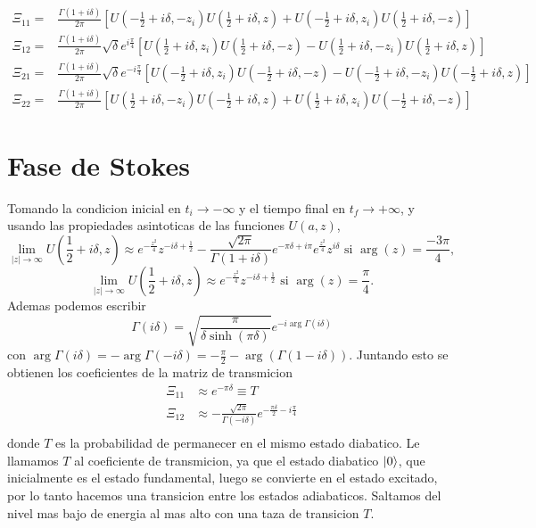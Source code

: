 \begin{align}
    \Xi_11=&\frac{\Gamma(1+i\delta)}{2\pi} \left[ U(-\frac{1}{2}+i\delta, -z_i)U(\frac{1}{2}+i\delta, z) + U(-\frac{1}{2}+i\delta, z_i)U(\frac{1}{2}+i\delta, -z) \right] \\
    \Xi_{12}=&\frac{\Gamma(1+i\delta)}{2\pi} \sqrt{\delta} e^{i\frac{\pi}{4}} \left[ U(\frac{1}{2}+i\delta, z_i)U(\frac{1}{2}+i\delta, -z) - U(\frac{1}{2}+i\delta, -z_i)U(\frac{1}{2}+i\delta, z) \right] \\
    \Xi_{21}=&\frac{\Gamma(1+i\delta)}{2\pi} \sqrt{\delta} e^{-i\frac{\pi}{4}} \left[ U(-\frac{1}{2}+i\delta, z_i) U(-\frac{1}{2}+i\delta, -z)- U(-\frac{1}{2}+i\delta, -z_i)U(-\frac{1}{2}+i\delta, z) \right] \\
    \Xi_{22}=&\frac{\Gamma(1+i\delta)}{2\pi} \left[ U(\frac{1}{2}+i\delta, -z_i)U(-\frac{1}{2}+i\delta, z) + U(\frac{1}{2}+i\delta, z_i)U(-\frac{1}{2}+i\delta, -z) \right]
\end{align}
\section{Fase de Stokes}
Tomando la condicion inicial en $t_i \to -\infty$ y el tiempo final en $t_f \to +\infty$, y usando las propiedades asintoticas de las funciones $U(a,z)$, 
\begin{equation}
    \lim_{|z|\to\infty} U(\frac{1}{2}+i\delta,z) \approx e^{-\frac{z^2}{4}} z^{-i\delta+\frac{1}{2}} - \frac{\sqrt{2\pi}}{\Gamma(1+i\delta)} e^{-\pi\delta+i\pi} e^{\frac{z^2}{4}} z^{i\delta} \,\, \text{si } \arg(z)=\frac{-3\pi}{4},
\end{equation}
\begin{equation}
    \lim_{|z|\to\infty} U(\frac{1}{2}+i\delta,z) \approx e^{-\frac{z^2}{4}} z^{-i\delta+\frac{1}{2}} \,\, \text{si } \arg(z)=\frac{\pi}{4}.
\end{equation}
Ademas podemos escribir
\begin{equation}
    \Gamma(i\delta)=\sqrt{\frac{\pi}{\delta\sinh(\pi\delta)}} e^{-i \arg\Gamma(i\delta)}
\end{equation}
con $\arg\Gamma(i\delta)=-\arg\Gamma(-i\delta)=-\frac{\pi}{2}-\arg(\Gamma(1-i\delta))$. Juntando esto se obtienen los coeficientes de la matriz de transmicion 
\begin{align}
    \Xi_{11} &\approx e^{-\pi\delta} \equiv T \\
    \Xi_{12} &\approx -\frac{\sqrt{2\pi}}{\Gamma(-i\delta)} e^{-\frac{\pi\delta}{2}-i\frac{\pi}{4}} \\
\end{align}
donde $T$ es la probabilidad de permanecer en el mismo estado diabatico. Le llamamos $T$ al coeficiente de transmicion, ya que el estado diabatico $\ket{0}$, que inicialmente es el estado fundamental, luego se convierte en el estado excitado, por lo tanto hacemos una transicion entre los estados adiabaticos. Saltamos del nivel mas bajo de energia al mas alto con una taza de transicion $T$.

